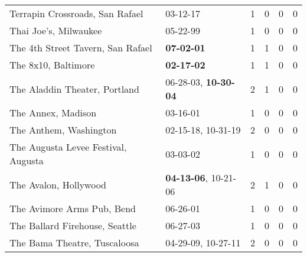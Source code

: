 \begin{longtable}{p{}p{}p{}p{}p{}p{}}
                                              Terrapin Crossroads, San Rafael &                                                03-12-17\textsuperscript{} &  1 &  0 &  0 &  0 \\
                                                        Thai Joe's, Milwaukee &                                                05-22-99\textsuperscript{} &  1 &  0 &  0 &  0 \\
                                            The 4th Street Tavern, San Rafael &                                       \textbf{07-02-01\textsuperscript{}} &  1 &  1 &  0 &  0 \\
                                                          The 8x10, Baltimore &                                       \textbf{02-17-02\textsuperscript{}} &  1 &  1 &  0 &  0 \\
                                                The Aladdin Theater, Portland &           06-28-03\textsuperscript{}, \textbf{10-30-04\textsuperscript{}} &  2 &  1 &  0 &  0 \\
                                                           The Annex, Madison &                                                03-16-01\textsuperscript{} &  1 &  0 &  0 &  0 \\
                                                       The Anthem, Washington &                    02-15-18\textsuperscript{}, 10-31-19\textsuperscript{} &  2 &  0 &  0 &  0 \\
                                          The Augusta Levee Festival, Augusta &                                                03-03-02\textsuperscript{} &  1 &  0 &  0 &  0 \\
                                                        The Avalon, Hollywood &           \textbf{04-13-06\textsuperscript{}}, 10-21-06\textsuperscript{} &  2 &  1 &  0 &  0 \\
                                                   The Avimore Arms Pub, Bend &                                                06-26-01\textsuperscript{} &  1 &  0 &  0 &  0 \\
                                               The Ballard Firehouse, Seattle &                                                06-27-03\textsuperscript{} &  1 &  0 &  0 &  0 \\
                                                 The Bama Theatre, Tuscaloosa &                    04-29-09\textsuperscript{}, 10-27-11\textsuperscript{} &  2 &  0 &  0 &  0 \\

\end{longtable}
